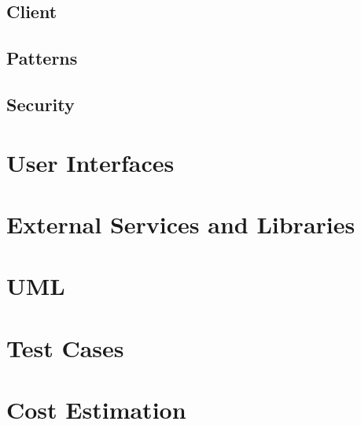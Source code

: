 \documentclass[numbers=noenddot, 12pt, a4paper, oneside]{scrbook}
\begin{document}
\section{Client}
\section{Patterns}
\section{Security}

\chapter{User Interfaces}


\chapter{External Services and Libraries}

\chapter{UML}

\chapter{Test Cases}
\chapter{Cost Estimation}
\end{document}
